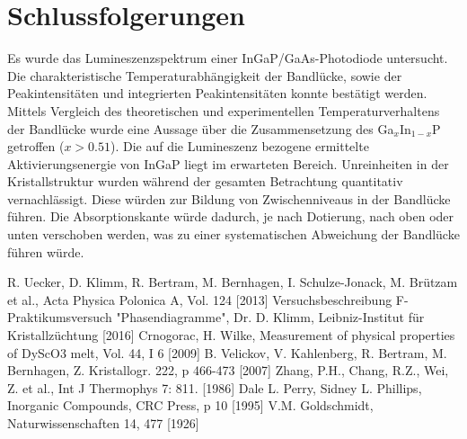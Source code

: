 \documentclass[aps,twocolumn,secnumarabic,nobalancelastpage,amsmath,amssymb,
nofootinbib,superscriptaddress]{revtex4-1}
\begin{document}

\section{Schlussfolgerungen}

\noindent Es wurde das Lumineszenzspektrum einer InGaP/GaAs-Photodiode untersucht. Die charakteristische Temperaturabhängigkeit der
Bandlücke, sowie der Peakintensitäten und integrierten Peakintensitäten konnte bestätigt werden. Mittels Vergleich des theoretischen
und experimentellen Temperaturverhaltens der Bandlücke wurde eine Aussage über die Zusammensetzung des Ga$_x$In$_{1-x}$P getroffen
($x>0.51$). Die auf die Lumineszenz bezogene ermittelte Aktivierungsenergie von InGaP liegt im erwarteten Bereich.
Unreinheiten in der Kristallstruktur wurden während der gesamten Betrachtung quantitativ vernachlässigt. Diese würden zur Bildung
von Zwischenniveaus in der Bandlücke führen. Die Absorptionskante würde dadurch, je nach Dotierung, nach oben oder unten verschoben werden, was
zu einer systematischen Abweichung der Bandlücke führen würde.





\begin{thebibliography}{99}
R. Uecker, D. Klimm, R. Bertram, M. Bernhagen, I. Schulze-Jonack, M. Brützam et al., Acta Physica Polonica A, Vol. 124 [2013]
Versuchsbeschreibung F-Praktikumsversuch "Phasendiagramme", Dr. D. Klimm, Leibniz-Institut für Kristallzüchtung [2016]
Crnogorac, H. Wilke, Measurement of physical properties of DyScO3 melt, Vol. 44, I 6 [2009]
B. Velickov, V. Kahlenberg, R. Bertram, M. Bernhagen, Z. Kristallogr. 222, p 466-473 [2007]
Zhang, P.H., Chang, R.Z., Wei, Z. et al., Int J Thermophys 7: 811. [1986]
Dale L. Perry, Sidney L. Phillips, Inorganic Compounds, CRC Press, p 10 [1995]
V.M. Goldschmidt, Naturwissenschaften 14, 477 [1926]
\end{thebibliography}


\clearpage
\appendix

\end{document}

